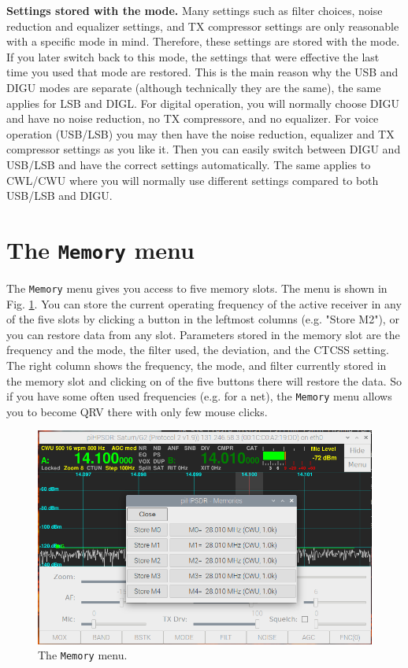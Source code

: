 \documentclass[12pt]{book}
\def\bltt#1{\texttt{\color{blue}#1}}
\begin{document}
\textbf{Settings stored with the mode.} Many settings such as filter choices, noise reduction
and equalizer settings, and TX compressor settings
 are only reasonable with a specific mode in mind. Therefore, these settings are stored with
 the mode. If you later switch back to this mode, the settings that were effective the last
 time you used that mode are restored. This is the main reason why the USB and DIGU modes
 are separate (although technically they are the same), the same applies for LSB and DIGL. 
 For digital operation, you will normally choose DIGU and have no noise reduction, no TX
 compressore, and no equalizer. For voice operation (USB/LSB) you may then have the
 noise reduction, equalizer and TX compressor settings as you like it. Then you can easily
 switch between DIGU and USB/LSB and have the correct settings automatically. The same applies
 to CWL/CWU where you will normally use different settings compared to both USB/LSB and DIGU.

\clearpage
\section{The \texttt{Memory}  menu}

The \bltt{Memory} menu gives you access to five memory slots. The menu is shown in Fig. \ref{fig:MemMenu}.
You can store the current
operating frequency  of the active receiver in any of the five slots by clicking a
button in the leftmost columns (e.g. "Store M2"), or you can restore
data from any slot. Parameters stored in the memory slot are 
the frequency and the mode, the filter used, the deviation, and the CTCSS setting.
The right column shows the frequency, the mode,
and filter currently stored in the memory slot and clicking on of the five buttons there will restore
the data. So if you have some often used frequencies (e.g. for a net), the
\bltt{Memory} menu allows you to become QRV there with only few mouse clicks.

 \begin{figure}[ht]
\center
\includegraphics[width=12cm]{MemMenu.png}
\caption{The \bltt{Memory} menu.}
\label{fig:MemMenu}
\end{figure}
\end{document}
